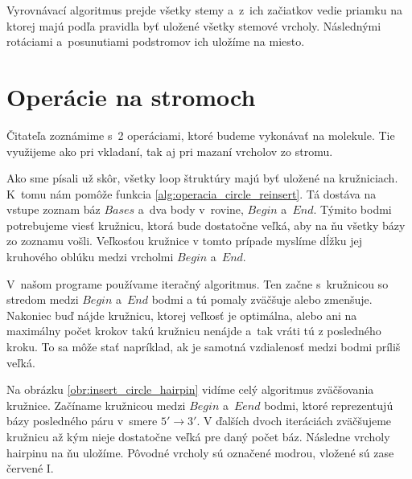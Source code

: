Vyrovnávací algoritmus prejde všetky stemy a~z~ich začiatkov vedie priamku na ktorej
majú podľa pravidla byť uložené všetky stemové vrcholy. Následnými rotáciami
a~posunutiami podstromov ich uložíme na miesto.




\section{Operácie na stromoch}

Čitateľa zoznámime s~2 operáciami, ktoré budeme vykonávať na molekule. Tie využijeme
ako pri vkladaní, tak aj pri mazaní vrcholov zo stromu.



Ako sme písali už skôr, všetky loop štruktúry majú byť uložené na kružniciach.
K~tomu nám pomôže funkcia \ref{alg:operacia_circle_reinsert}.
Tá dostáva na vstupe zoznam báz $Bases$ a~dva body v~rovine, $Begin$ a~$End$.
Týmito bodmi potrebujeme viesť kružnicu, ktorá bude dostatočne veľká, aby
na ňu všetky bázy zo zoznamu vošli. Veľkosťou kružnice v tomto prípade myslíme
dĺžku jej kruhového oblúku medzi vrcholmi $Begin$ a~$End$.

V~našom programe používame iteračný algoritmus. Ten začne s~kružnicou so stredom
medzi $Begin$ a~$End$ bodmi a tú pomaly zväčšuje alebo zmenšuje.
Nakoniec buď nájde kružnicu, ktorej veľkosť je optimálna, alebo ani na maximálny
počet krokov takú kružnicu nenájde a~tak vráti tú z posledného kroku.
To sa môže stať napríklad, ak je samotná vzdialenosť medzi bodmi príliš veľká.

Na obrázku \ref{obr:insert_circle_hairpin} vidíme celý algoritmus zväčšovania kružnice.
Začíname kružnicou medzi $Begin$ a~$Eend$ bodmi, ktoré reprezentujú bázy posledného
páru v~smere $5' \to 3'$. V ďalších dvoch iteráciách zväčšujeme kružnicu až kým
nieje dostatočne veľká pre daný počet báz. Následne vrcholy hairpinu na ňu uložíme.
Pôvodné vrcholy sú označené modrou, vložené sú zase červené I.

\renewcommand{\wi}{0.24\textwidth}

